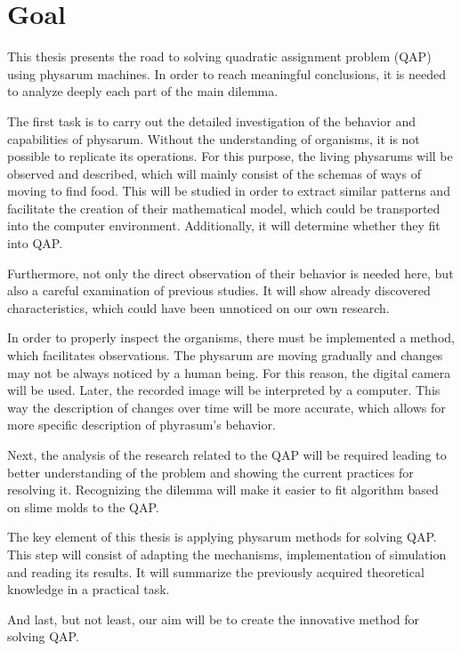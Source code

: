 \section{Goal}
\label{section:introduction_goal}

This thesis presents the road to solving quadratic assignment problem (QAP) using physarum machines. In order to reach meaningful conclusions, it is needed to analyze deeply each part of the main dilemma.

The first task is to carry out the detailed investigation of the behavior and capabilities of physarum. Without the understanding of organisms, it is not possible to replicate its operations. For this purpose, the living physarums will be observed and described, which will mainly consist of the schemas of ways of moving to find food. This will be studied in order to extract similar patterns and facilitate the creation of their mathematical model, which could be transported into the computer environment. Additionally, it will determine whether they fit into QAP. 

Furthermore, not only the direct observation of their behavior is needed here, but also a careful examination of previous studies. It will show already discovered characteristics, which could have been unnoticed on our own research.

In order to properly inspect the organisms, there must be implemented a method, which facilitates observations. The physarum are moving gradually and changes may not be always noticed by a human being. For this reason, the digital camera will be used. Later, the recorded image will be interpreted by a computer. This way the description of changes over time will be more accurate, which allows for more specific description of phyrasum's behavior.

Next, the analysis of the research related to the QAP will be required leading to better understanding of the problem and showing the current practices for resolving it. Recognizing the dilemma will make it easier to fit algorithm based on slime molds to the QAP.

The key element of this thesis is applying physarum methods for solving QAP. This step will consist of adapting the mechanisms, implementation of simulation and reading its results. It will summarize the previously acquired theoretical knowledge in a practical task.

And last, but not least, our aim will be to create the innovative method for solving QAP.
